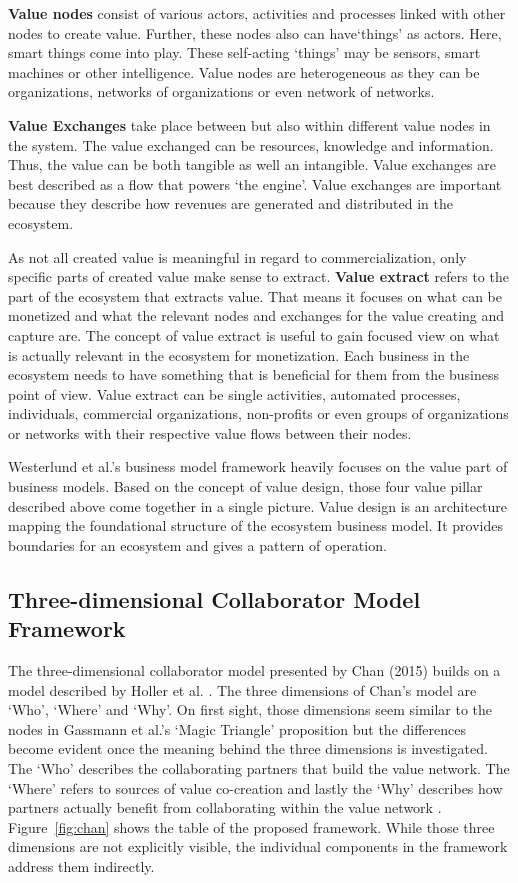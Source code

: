 		\textbf{Value nodes} consist of various actors, activities and processes linked with other nodes to create value. Further, these nodes also can have`things' as actors. Here, smart things come into play. These self-acting `things' may be sensors, smart machines or other intelligence. Value nodes are heterogeneous as they can be organizations, networks of organizations or even network of networks.

		\textbf{Value Exchanges} take place between but also within different value nodes in the system. The value exchanged can be resources, knowledge and information. Thus, the value can be both tangible as well an intangible. Value exchanges are best described as a flow that powers `the engine'. Value exchanges are important because they describe how revenues are generated and distributed in the ecosystem.

		As not all created value is meaningful in regard to commercialization, only specific parts of created value make sense to extract. \textbf{Value extract} refers to the part of the ecosystem that extracts value. That means it focuses on what can be monetized and what the relevant nodes and exchanges for the value creating and capture are. The concept of value extract is useful to gain focused view on what is actually relevant in the ecosystem for monetization. Each business in the ecosystem needs to have something that is beneficial for them from the business point of view. Value extract can be single activities, automated processes, individuals, commercial organizations, non-profits or even groups of organizations or networks with their respective value flows between their nodes.

		Westerlund et al.'s business model framework heavily focuses on the value part of business models. Based on the concept of value design, those four value pillar described above come together in a single picture. Value design is an architecture mapping the foundational structure of the ecosystem business model. It provides boundaries for an ecosystem and gives a pattern of operation.

	\subsection{Three-dimensional Collaborator Model Framework}
		The three-dimensional collaborator model presented by Chan (2015) \cite{chan} builds on a model described by Holler et al. \cite{holler}. The three dimensions of Chan's model are `Who', `Where' and `Why'. On first sight, those dimensions seem similar to the nodes in Gassmann et al.'s `Magic Triangle' proposition but the differences become evident once the meaning behind the three dimensions is investigated. The `Who' describes the collaborating partners that build the value network. The `Where' refers to sources of value co-creation and lastly the `Why' describes how partners actually benefit from collaborating within the value network \cite{chan}. Figure~\ref{fig:chan} shows the table of the proposed framework. While those three dimensions are not explicitly visible, the individual components in the framework address them indirectly.

